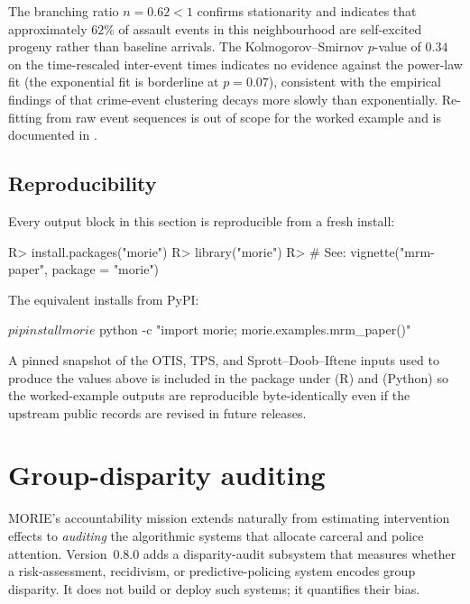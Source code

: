 \documentclass[article,shortnames,nojss]{jss}
\begin{document}
The branching ratio $n = 0.62 < 1$ confirms stationarity and
indicates that approximately $62\%$ of assault events in this
neighbourhood are self-excited progeny rather than baseline
arrivals.  The Kolmogorov--Smirnov $p$-value of $0.34$ on the
time-rescaled inter-event times indicates no evidence against
the power-law fit (the exponential fit is borderline at
$p = 0.07$), consistent with the empirical findings of
\citet{Mohler2011} that crime-event clustering decays more slowly
than exponentially.  Re-fitting from raw event sequences is
out of scope for the worked example and is documented in
\citet{Ruhela2026Hawkes}.

\subsection{Reproducibility}

Every output block in this section is reproducible from a fresh
install:

\begin{CodeChunk}
\begin{CodeInput}
R> install.packages("morie")
R> library("morie")
R> # See: vignette("mrm-paper", package = "morie")
\end{CodeInput}
\end{CodeChunk}

The  equivalent installs from PyPI:

\begin{CodeChunk}
\begin{CodeInput}
$ pip install morie
$ python -c "import morie; morie.examples.mrm_paper()"
\end{CodeInput}
\end{CodeChunk}

A pinned snapshot of the OTIS, TPS, and Sprott--Doob--Iftene
inputs used to produce the values above is included in the
package under  (R) and
 (Python) so the worked-example outputs are
reproducible byte-identically even if the upstream public records
are revised in future releases.

\section{Group-disparity auditing}
\label{sec:fairness}

MORIE's accountability mission extends naturally from estimating
intervention effects to \emph{auditing} the algorithmic systems that
allocate carceral and police attention.  Version~0.8.0 adds a
disparity-audit subsystem that measures whether a risk-assessment,
recidivism, or predictive-policing system encodes group disparity.  It
does not build or deploy such systems; it quantifies their bias.
\end{document}
